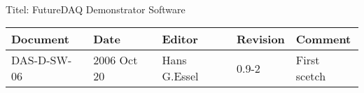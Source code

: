 \\Titel: FutureDAQ Demonstrator Software
\begin{table}[h]
\begin{tabular}{|p{2.8cm}|p{2.0cm}|p{3.0cm}|p{1.6cm}|p{5.0cm}|} \hline
Document   & Date        & Editor       & Revision & Comment \\
\hline DAS-D-SW-06 & 2006 Oct 20 & Hans G.Essel & 0.9-2    & First
scetch \\ \hline
\end{tabular}
\end{table}
